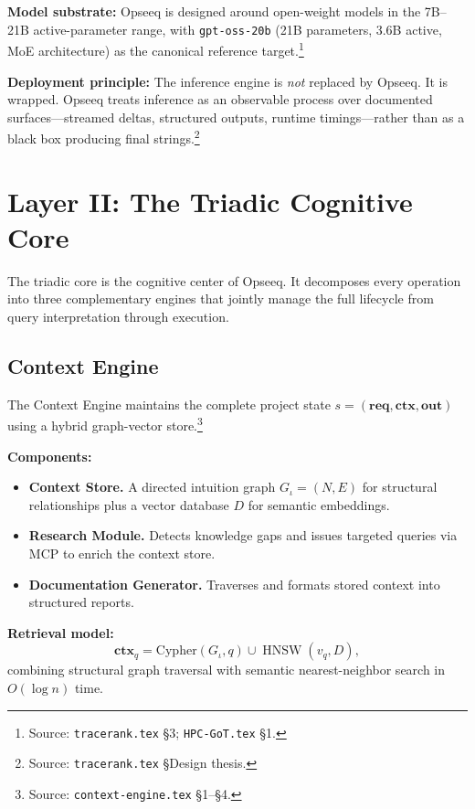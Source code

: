 \documentclass[11pt]{article}
\theoremstyle{remark}
\DeclareMathOperator{\HNSW}{HNSW}
\newcommand{\req}{\mathbf{req}}
\newcommand{\ctx}{\mathbf{ctx}}
\newcommand{\out}{\mathbf{out}}
\newcommand{\ctxq}{\mathbf{ctx}_q}
\begin{document}
\textbf{Model substrate:} Opseeq is designed around open-weight models in the 7B--21B active-parameter range, with \texttt{gpt-oss-20b} (21B parameters, 3.6B active, MoE architecture) as the canonical reference target.\footnote{Source: \texttt{tracerank.tex} \S3; \texttt{HPC-GoT.tex} \S1.}

\textbf{Deployment principle:} The inference engine is \emph{not} replaced by Opseeq. It is wrapped. Opseeq treats inference as an observable process over documented surfaces---streamed deltas, structured outputs, runtime timings---rather than as a black box producing final strings.\footnote{Source: \texttt{tracerank.tex} \S Design thesis.}

\section{Layer II: The Triadic Cognitive Core}
\label{sec:triad}

The triadic core is the cognitive center of Opseeq. It decomposes every operation into three complementary engines that jointly manage the full lifecycle from query interpretation through execution.

\subsection{Context Engine}
\label{subsec:context}

The Context Engine maintains the complete project state $s = (\req, \ctx, \out)$ using a hybrid graph-vector store.\footnote{Source: \texttt{context-engine.tex} \S1--\S4.}

\textbf{Components:}
\begin{itemize}
  \item \textbf{Context Store.} A directed intuition graph $G_\iota = (N, E)$ for structural relationships plus a vector database $D$ for semantic embeddings.
  \item \textbf{Research Module.} Detects knowledge gaps and issues targeted queries via MCP to enrich the context store.
  \item \textbf{Documentation Generator.} Traverses and formats stored context into structured reports.
\end{itemize}

\textbf{Retrieval model:}
\[
\ctxq = \mathrm{Cypher}(G_\iota, q) \cup \HNSW(v_q, D),
\]
combining structural graph traversal with semantic nearest-neighbor search in $O(\log n)$ time.
\end{document}

